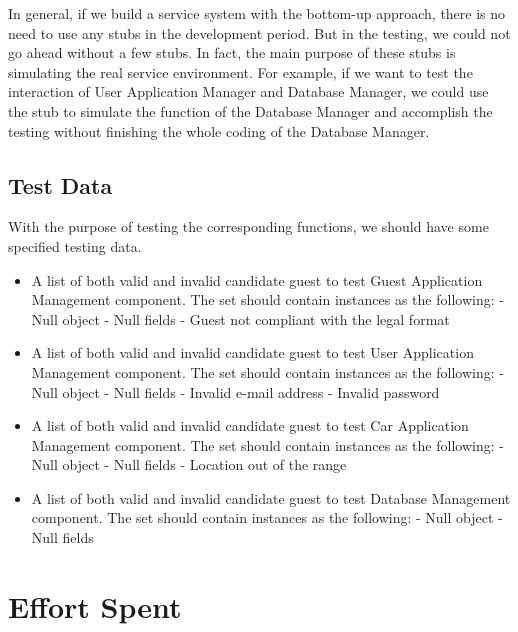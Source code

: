 \documentclass{article}
\begin{document}
In general, if we build a service system with the bottom-up approach, there is no need to use any stubs in the development period. But in the testing, we could not go ahead without a few stubs. 
\newline
In fact, the main purpose of these stubs is simulating the real service environment. For example, if we want to test the interaction of User Application Manager and Database Manager, we could use the stub to simulate the function of the Database Manager and accomplish the testing without finishing the whole coding of the Database Manager. 
\newline 

\subsection{Test Data}
With the purpose of testing the corresponding functions, we should have some specified testing data.
\begin{itemize}
	
	\item A list of both valid and invalid candidate guest to test Guest Application Management component. The set should contain instances as the following:
	\newline
	\newline - Null object
	\newline - Null fields
	\newline - Guest not compliant with the legal format
	
	\item A list of both valid and invalid candidate guest to test User Application Management component. The set should contain instances as the following:
	\newline
	\newline - Null object
	\newline - Null fields
	\newline - Invalid e-mail address
	\newline - Invalid password
	
	\item A list of both valid and invalid candidate guest to test Car Application Management component. The set should contain instances as the following:
	\newline
	\newline - Null object
	\newline - Null fields
	\newline - Location out of the range
	
	\item A list of both valid and invalid candidate guest to test Database Management component. The set should contain instances as the following:
	\newline
	\newline - Null object
	\newline - Null fields
	
\end{itemize}
\newpage

\section{Effort Spent}
\end{document}
